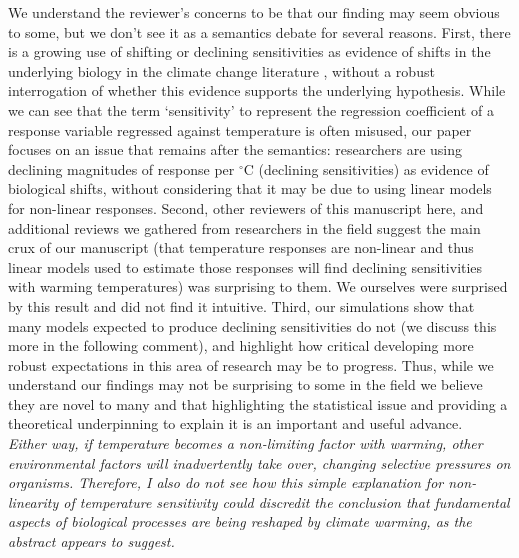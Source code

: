 \documentclass[11pt]{article}
\begin{document}
We understand the reviewer's concerns to be that our finding may seem obvious to some, but we don't see it as a semantics debate for several reasons. First, there is a growing use of shifting or declining sensitivities as evidence of shifts in the underlying biology in the climate change literature \citep[e.g.,][]{fu2015,piao2017}, without a robust interrogation of whether this evidence supports the underlying hypothesis. While we can see that the term `sensitivity' to represent the regression coefficient of a response variable regressed against temperature is often misused, our paper focuses on an issue that remains after the semantics: researchers are using declining magnitudes of response per $^{\circ}$C (declining sensitivities) as evidence of biological shifts, without considering that it may be due to using linear models for non-linear responses. Second, other reviewers of this manuscript here, and additional reviews we gathered from researchers in the field suggest the main crux of our manuscript (that temperature responses are non-linear and thus linear models used to estimate those responses will find declining sensitivities with warming temperatures) was surprising to them. We ourselves were surprised by this result and did not find it intuitive. Third, our simulations show that many models expected to produce declining sensitivities do not (we discuss this more in the following comment), and highlight how critical developing more robust expectations in this area of research may be to progress. Thus, while we understand our findings may not be surprising to some in the field we believe they are novel to many and that highlighting the statistical issue and providing a theoretical underpinning to explain it is an important and useful advance.\\

\emph{Either way, if temperature becomes a non-limiting factor with warming, other environmental factors will inadvertently take over, changing selective pressures on organisms. Therefore, I also do not see how this simple explanation for non-linearity of temperature sensitivity could discredit the conclusion that fundamental aspects of biological processes are being reshaped by climate warming, as the abstract appears to suggest.}\\
\end{document}
